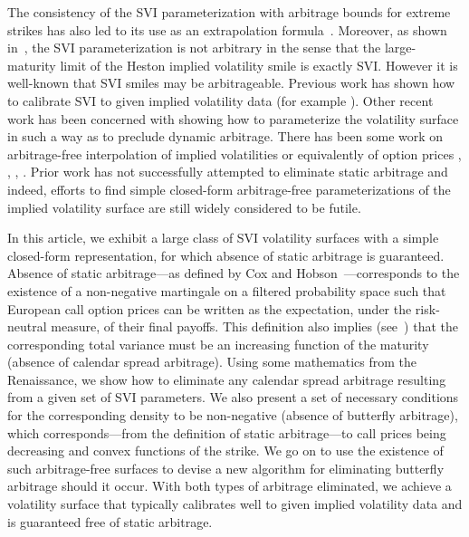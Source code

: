 \documentclass[12pt]{article}
\numberwithin{equation}{section}
\begin{document}
The consistency of the SVI parameterization with arbitrage bounds for extreme strikes has also led to its use as an extrapolation formula~\cite{HypHyp}.
Moreover, as shown in~\cite{GatheralJacquier}, the SVI parameterization is not arbitrary in the sense that the large-maturity limit of the Heston implied volatility smile is exactly SVI.  
However it is well-known that SVI smiles may be arbitrageable.
Previous work has shown how to calibrate SVI to given implied volatility data (for example \cite{Zeliade}).  
Other recent work \cite{CarrWu} has been concerned with showing how to parameterize the volatility surface in such a way as to preclude dynamic arbitrage.  
There has been some work on arbitrage-free interpolation of implied volatilities or equivalently of option prices \cite{AndreasenHuge}, \cite{Fengler}, \cite{GlaserHeider}, \cite{Kahale}.  
Prior work has not successfully attempted to eliminate static arbitrage and indeed, efforts to find simple closed-form arbitrage-free parameterizations of the implied volatility surface are still widely considered to be futile.

In this article, we exhibit a large class of SVI volatility surfaces with a simple closed-form representation, for which absence of static arbitrage is guaranteed.
Absence of static arbitrage---as defined by Cox and Hobson~\cite{CoxHobson}---corresponds 
to the existence of a non-negative martingale on a filtered probability space such that European call option prices can be written as the expectation, under the risk-neutral measure, of their final payoffs.
This definition also implies (see~\cite{Fengler}) that the corresponding total variance must be an increasing function of the maturity (absence of calendar spread arbitrage).
Using some mathematics from the Renaissance, we show how to eliminate any calendar spread arbitrage resulting from a given set of SVI parameters.
We also present a set of necessary conditions for the corresponding density to be non-negative (absence of butterfly arbitrage), 
which corresponds---from the definition of static arbitrage---to call prices being decreasing and convex functions of the strike.
We go on to use the existence of such arbitrage-free surfaces to devise a new algorithm for eliminating butterfly arbitrage should it occur.  
With both types of arbitrage eliminated, we achieve a volatility surface that typically calibrates well to given implied volatility data and is guaranteed free of static arbitrage.
\end{document}
